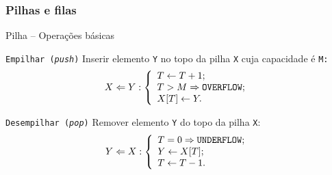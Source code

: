 \subsubsection{Pilhas e filas}

\begin{frame}{Pilha -- Operações básicas}

\begin{block}{{\tt Empilhar ({\em push})}}
Inserir elemento {\tt Y} \alert{no topo} da pilha {\tt X} cuja capacidade é \tt{M}:\\

\[
 X \Leftarrow Y :  
\left\{
\begin{array}{l}
 T \leftarrow T + 1;\\
 T > M \Rightarrow {\tt OVERFLOW};\\
 X[T] \leftarrow Y.
\end{array}
 \right.
\]

\end{block}


\begin{block}{{\tt Desempilhar ({\em pop})}}
Remover elemento {\tt Y} \alert{do topo} da pilha {\tt X}:\\

\[
 Y \Leftarrow X :  
\left\{
\begin{array}{l}
 T = 0 \Rightarrow {\tt UNDERFLOW};\\ 
 Y \leftarrow X[T];\\
 T \leftarrow T - 1.
\end{array}
 \right.
\]

\end{block}


\end{frame}

